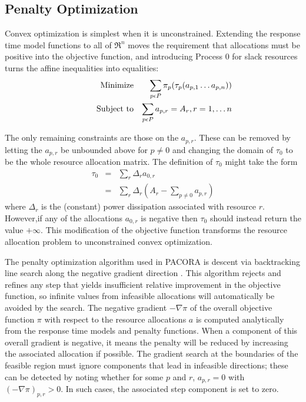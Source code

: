 \subsection*{Penalty Optimization}

Convex optimization is simplest when it is unconstrained.
Extending the response time model functions to all of $\Re^n$
moves the requirement that allocations must be positive into the objective function,
and introducing Process 0 for slack resources turns the affine inequalities into equalities:
\begin{eqnarray*}
& \makebox[1in][r]{Minimize}   & \sum_{p\epsilon P} {\pi_p(\tau_p(a_{p,1}\ldots a_{p,n}))}  \\
& \makebox[1in][r]{Subject to} & \sum_{p\epsilon P} a_{p,r} = A_r, r = 1,\ldots n           \\
\end{eqnarray*}

The only remaining constraints are those on the $a_{p,r}$.
These can be removed by letting the $a_{p,r}$ be unbounded above for $p \neq 0$
and changing the domain of $\tau_0$  to be the whole resource allocation matrix.
The definition of $\tau_0$ might take the form
\begin{eqnarray*}
\tau_0 &=& \sum_r \Delta_r a_{0,r}     \\
       &=& \sum_r \Delta_r ( A_r - \sum_{p \neq 0} a_{p,r} )
\end{eqnarray*}
where $\Delta_r$ is the (constant) power dissipation associated with resource $r$.
However,if any of the allocations $a_{0,r}$ is negative then $\tau_0$  should instead return the value $+\infty$.
This modification of the objective function transforms the resource allocation problem
to unconstrained convex optimization.

The penalty optimization algorithm used in PACORA is descent via backtracking line search along the negative gradient direction \cite{BoVa}.
This algorithm rejects and refines any step that yields insufficient relative improvement in the objective function,
so infinite values from infeasible allocations will automatically be avoided by the search.
The negative gradient $-\nabla\pi$ of the overall objective function $\pi$
with respect to the resource allocations $a$
is computed analytically from the response time models and penalty functions.
When a component of this overall gradient is negative,
it means the penalty will be reduced by increasing the associated allocation if possible.
The gradient search at the boundaries of the feasible region
must ignore components that lead in infeasible directions;
these can be detected by noting whether for some $p$ and $r$, $a_{p,r} = 0$ with $(-\nabla\pi)_{p,r} > 0$.
In such cases, the associated step component is set to zero.


